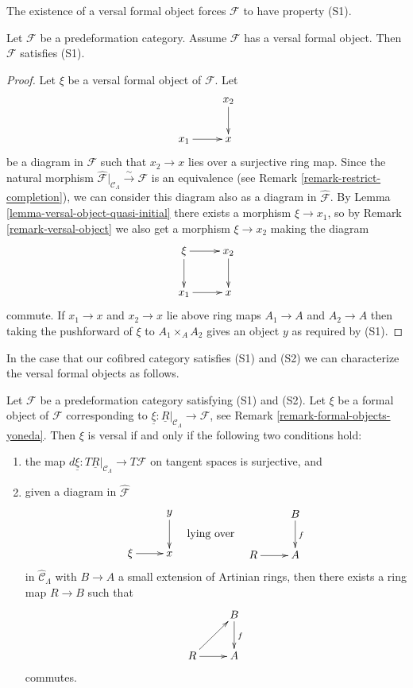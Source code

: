 \noindent
The existence of a versal formal object forces $\mathcal{F}$ to have
property (S1).

\begin{lemma}
\label{lemma-versal-object-S1}
Let $\mathcal{F}$ be a predeformation category.
Assume $\mathcal{F}$ has a versal formal object.
Then $\mathcal{F}$ satisfies (S1).
\end{lemma}

\begin{proof}
Let $\xi$ be a versal formal object of $\mathcal{F}$. Let
$$
\xymatrix{
           & x_2 \ar[d] \\
x_1 \ar[r] & x
}
$$
be a diagram in $\mathcal{F}$ such that $x_2 \to x$ lies over a
surjective ring map. Since the natural morphism
$\widehat{\mathcal{F}}|_{\mathcal{C}_\Lambda} \xrightarrow{\sim} \mathcal{F}$
is an equivalence (see
Remark \ref{remark-restrict-completion}), we can consider this
diagram also as a diagram in $\widehat{\mathcal{F}}$. By
Lemma \ref{lemma-versal-object-quasi-initial} there exists a morphism
$\xi \to x_1$, so by
Remark \ref{remark-versal-object} we also get a
morphism $\xi \to x_2$ making the diagram
$$
\xymatrix{
\xi \ar[r] \ar[d]          & x_2 \ar[d] \\
x_1 \ar[r] & x
}
$$
commute. If $x_1 \to x$ and $x_2 \to x$ lie above ring maps
$A_1 \to A$ and $A_2 \to A$ then taking the pushforward of
$\xi$ to $A_1 \times_A A_2$ gives an object $y$ as required by (S1).
\end{proof}

\noindent
In the case that our cofibred category satisfies (S1) and (S2)
we can characterize the versal formal objects as follows.

\begin{lemma}
\label{lemma-versal-criterion}
Let $\mathcal{F}$ be a predeformation category satisfying (S1) and
(S2). Let $\xi$ be a formal object of $\mathcal{F}$ corresponding to
$\underline{\xi} : \underline{R}|_{\mathcal{C}_\Lambda} \to \mathcal{F}$, see
Remark \ref{remark-formal-objects-yoneda}.
Then $\xi$ is versal if and only if the following two conditions hold:
\begin{enumerate}
\item the map
$d\underline{\xi} : T\underline{R}|_{\mathcal{C}_\Lambda} \to T\mathcal{F}$
on tangent spaces is surjective, and
\item given a diagram in $\widehat{\mathcal{F}}$
$$
\vcenter{
\xymatrix{
            &  y \ar[d] \\
\xi \ar[r]  &  x
}
}
\quad\text{lying over}\quad
\vcenter{
\xymatrix{
         &   B  \ar[d]^{f} \\
R \ar[r] &   A
}
}
$$
in $\widehat{\mathcal{C}}_\Lambda$ with $B \to A$ a small extension of
Artinian rings, then there exists a ring map $R \to B$ such that
$$
\xymatrix{
         &   B  \ar[d]^{f} \\
R \ar[ur] \ar[r] &   A
}
$$
commutes.
\end{enumerate}
\end{lemma}

